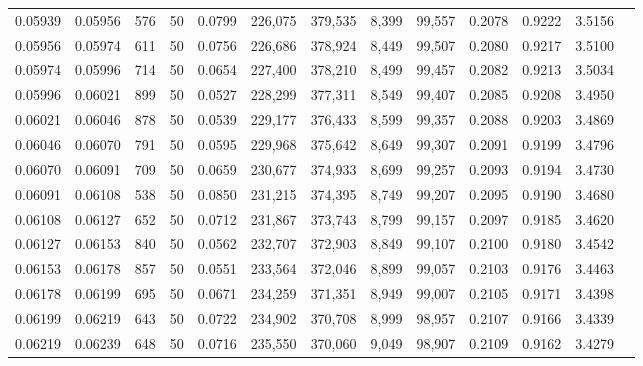 \begin{tabular}{rrrrrrrrrrrrr}
0.05939 & 0.05956 &   576 &  50 &                                     0.0799 & 226,075 & 379,535 &   8,399 &  99,557 & 0.2078 & 0.9222 & 3.5156 \\
0.05956 & 0.05974 &   611 &  50 &                                     0.0756 & 226,686 & 378,924 &   8,449 &  99,507 & 0.2080 & 0.9217 & 3.5100 \\
0.05974 & 0.05996 &   714 &  50 &                                     0.0654 & 227,400 & 378,210 &   8,499 &  99,457 & 0.2082 & 0.9213 & 3.5034 \\
0.05996 & 0.06021 &   899 &  50 &                                     0.0527 & 228,299 & 377,311 &   8,549 &  99,407 & 0.2085 & 0.9208 & 3.4950 \\
0.06021 & 0.06046 &   878 &  50 &                                     0.0539 & 229,177 & 376,433 &   8,599 &  99,357 & 0.2088 & 0.9203 & 3.4869 \\
0.06046 & 0.06070 &   791 &  50 &                                     0.0595 & 229,968 & 375,642 &   8,649 &  99,307 & 0.2091 & 0.9199 & 3.4796 \\
0.06070 & 0.06091 &   709 &  50 &                                     0.0659 & 230,677 & 374,933 &   8,699 &  99,257 & 0.2093 & 0.9194 & 3.4730 \\
0.06091 & 0.06108 &   538 &  50 &                                     0.0850 & 231,215 & 374,395 &   8,749 &  99,207 & 0.2095 & 0.9190 & 3.4680 \\
0.06108 & 0.06127 &   652 &  50 &                                     0.0712 & 231,867 & 373,743 &   8,799 &  99,157 & 0.2097 & 0.9185 & 3.4620 \\
0.06127 & 0.06153 &   840 &  50 &                                     0.0562 & 232,707 & 372,903 &   8,849 &  99,107 & 0.2100 & 0.9180 & 3.4542 \\
0.06153 & 0.06178 &   857 &  50 &                                     0.0551 & 233,564 & 372,046 &   8,899 &  99,057 & 0.2103 & 0.9176 & 3.4463 \\
0.06178 & 0.06199 &   695 &  50 &                                     0.0671 & 234,259 & 371,351 &   8,949 &  99,007 & 0.2105 & 0.9171 & 3.4398 \\
0.06199 & 0.06219 &   643 &  50 &                                     0.0722 & 234,902 & 370,708 &   8,999 &  98,957 & 0.2107 & 0.9166 & 3.4339 \\
0.06219 & 0.06239 &   648 &  50 &                                     0.0716 & 235,550 & 370,060 &   9,049 &  98,907 & 0.2109 & 0.9162 & 3.4279 \\

\end{tabular}
